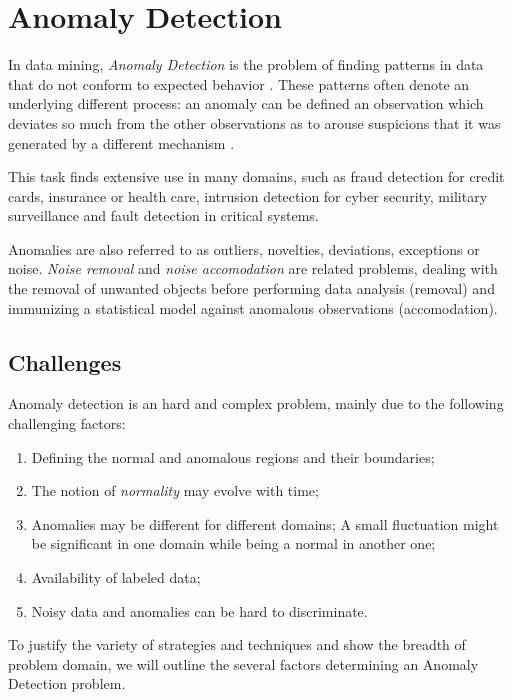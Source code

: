 \chapter{Anomaly Detection}

In data mining, \textit{Anomaly Detection} is the problem of finding patterns in data that do not conform to expected behavior \cite{chandola2009anomaly}. These patterns often denote an underlying different process: an anomaly can be defined an observation which deviates so much from the other observations as to arouse suspicions that it was generated by a different mechanism \cite{hawkins1980identification}.

This task finds extensive use in many domains, such as fraud detection for credit cards, insurance or health care, intrusion detection for cyber security, military surveillance and fault detection in critical systems.

Anomalies are also referred to as outliers, novelties, deviations, exceptions or noise. \textit{Noise removal} and \textit{noise accomodation} are related problems, dealing with the removal of unwanted objects before performing data analysis (removal) and immunizing a statistical model against anomalous observations (accomodation).

\section{Challenges}

Anomaly detection is an hard and complex problem, mainly due to the following challenging factors:

\begin{enumerate}
	\item Defining the normal and anomalous regions and their boundaries;
	\item The notion of \textit{normality} may evolve with time;
	\item Anomalies may be different for different domains; A small fluctuation might be significant in one domain while being a normal in another one;
	\item Availability of labeled data;
	\item Noisy data and anomalies can be hard to discriminate.
\end{enumerate}

To justify the variety of strategies and techniques and show the breadth of problem domain, we will outline the several factors determining an Anomaly Detection problem.

